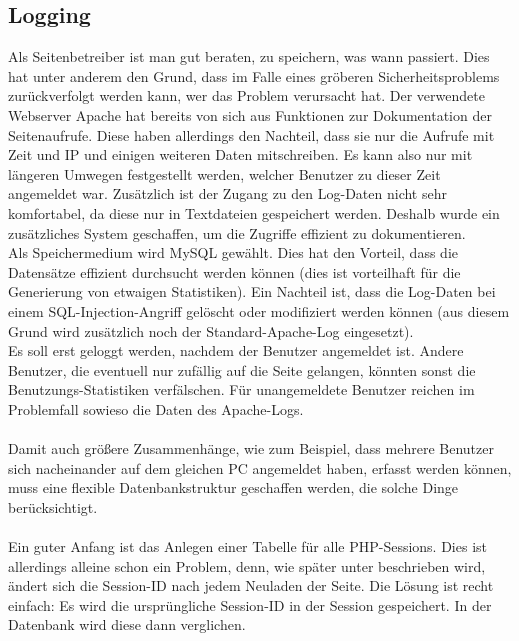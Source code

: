 \subsection{Logging}

Als Seitenbetreiber ist man gut beraten, zu speichern, was wann passiert. Dies hat unter anderem den Grund, dass im Falle eines gröberen Sicherheitsproblems zurückverfolgt werden kann, wer das Problem verursacht hat. Der verwendete Webserver Apache hat bereits von sich aus Funktionen zur Dokumentation der Seitenaufrufe. Diese haben allerdings den Nachteil, dass sie nur die Aufrufe mit Zeit und IP und einigen weiteren Daten mitschreiben. Es kann also nur mit längeren Umwegen festgestellt werden, welcher Benutzer zu dieser Zeit angemeldet war. Zusätzlich ist der Zugang zu den Log-Daten nicht sehr komfortabel, da diese nur in Textdateien gespeichert werden. Deshalb wurde ein zusätzliches System geschaffen, um die Zugriffe effizient zu dokumentieren.\\
Als Speichermedium wird MySQL gewählt. Dies hat den Vorteil, dass die Datensätze effizient durchsucht werden können (dies ist vorteilhaft für die Generierung von etwaigen Statistiken). Ein Nachteil ist, dass die Log-Daten bei einem SQL-Injection-Angriff gelöscht oder modifiziert werden können (aus diesem Grund wird zusätzlich noch der Standard-Apache-Log eingesetzt).\\
Es soll erst geloggt werden, nachdem der Benutzer angemeldet ist. Andere Benutzer, die eventuell nur zufällig auf die Seite gelangen, könnten sonst die Benutzungs-Statistiken verfälschen. Für unangemeldete Benutzer reichen im Problemfall sowieso die Daten des Apache-Logs.\\
\\
Damit auch größere Zusammenhänge, wie zum Beispiel, dass mehrere Benutzer sich nacheinander auf dem gleichen PC angemeldet haben, erfasst werden können, muss eine flexible Datenbankstruktur geschaffen werden, die solche Dinge berücksichtigt.\\
\\
Ein guter Anfang ist das Anlegen einer Tabelle für alle PHP-Sessions. Dies ist allerdings alleine schon ein Problem, denn, wie später unter  beschrieben wird, ändert sich die Session-ID nach jedem Neuladen der Seite. Die Lösung ist recht einfach: Es wird die ursprüngliche Session-ID in der Session gespeichert. In der Datenbank wird diese dann verglichen.\\
